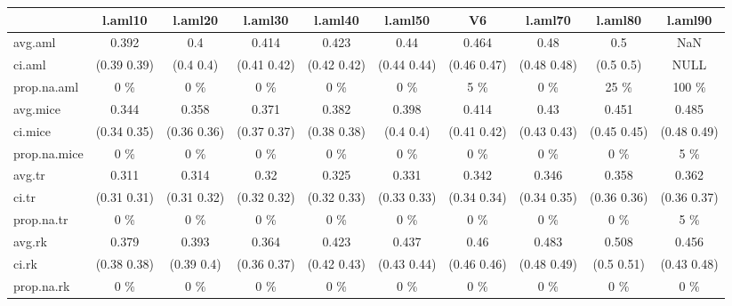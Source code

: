 \begin{table}[ht]
\centering
\begin{tabular}{|l|c|c|c|c|c|c|c|c|c|}
  \hline
 & l.aml10 & l.aml20 & l.aml30 & l.aml40 & l.aml50 & V6 & l.aml70 & l.aml80 & l.aml90 \\ 
  \hline
avg.aml & 0.392 & 0.4 & 0.414 & 0.423 & 0.44 & 0.464 & 0.48 & 0.5 & NaN \\ 
  ci.aml & (0.39 0.39) & (0.4 0.4) & (0.41 0.42) & (0.42 0.42) & (0.44 0.44) & (0.46 0.47) & (0.48 0.48) & (0.5 0.5) & NULL \\ 
  prop.na.aml & 0 \% & 0 \% & 0 \% & 0 \% & 0 \% & 5 \% & 0 \% & 25 \% & 100 \% \\ 
  avg.mice & 0.344 & 0.358 & 0.371 & 0.382 & 0.398 & 0.414 & 0.43 & 0.451 & 0.485 \\ 
  ci.mice & (0.34 0.35) & (0.36 0.36) & (0.37 0.37) & (0.38 0.38) & (0.4 0.4) & (0.41 0.42) & (0.43 0.43) & (0.45 0.45) & (0.48 0.49) \\ 
  prop.na.mice & 0 \% & 0 \% & 0 \% & 0 \% & 0 \% & 0 \% & 0 \% & 0 \% & 5 \% \\ 
  avg.tr & 0.311 & 0.314 & 0.32 & 0.325 & 0.331 & 0.342 & 0.346 & 0.358 & 0.362 \\ 
  ci.tr & (0.31 0.31) & (0.31 0.32) & (0.32 0.32) & (0.32 0.33) & (0.33 0.33) & (0.34 0.34) & (0.34 0.35) & (0.36 0.36) & (0.36 0.37) \\ 
  prop.na.tr & 0 \% & 0 \% & 0 \% & 0 \% & 0 \% & 0 \% & 0 \% & 0 \% & 5 \% \\ 
  avg.rk & 0.379 & 0.393 & 0.364 & 0.423 & 0.437 & 0.46 & 0.483 & 0.508 & 0.456 \\ 
  ci.rk & (0.38 0.38) & (0.39 0.4) & (0.36 0.37) & (0.42 0.43) & (0.43 0.44) & (0.46 0.46) & (0.48 0.49) & (0.5 0.51) & (0.43 0.48) \\ 
  prop.na.rk & 0 \% & 0 \% & 0 \% & 0 \% & 0 \% & 0 \% & 0 \% & 0 \% & 0 \% \\ 
   \hline
\end{tabular}
\end{table}
